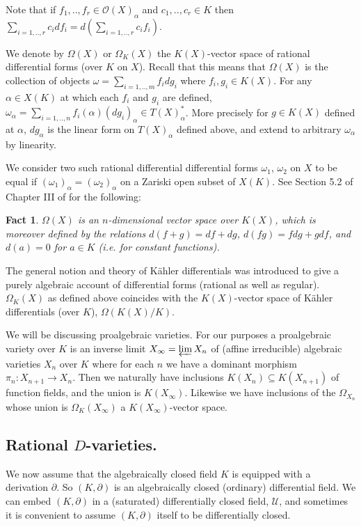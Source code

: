 \documentclass[12pt]{article}
\newtheorem{Fact}[Theorem]{Fact}
\begin{document}
Note that if $f_{1},..,f_{r}\in {\mathcal O}(X)_{\alpha}$ and $c_{1},..,c_{r}\in K$ then $\sum_{i=1,..,r}c_{i}df_{i} = d(\sum_{i=1,..,r}c_{i}f_{i})$. 

We denote by $\Omega(X)$ or $\Omega_{K}(X)$ the $K(X)$-vector space of rational differential forms (over $K$ on $X$).  Recall that this means that  ${\Omega}(X)$ is the collection of objects $\omega = \sum_{i=1,..,m}f_{i}dg_{i}$ where $f_{i}, g_{i}\in K(X)$. 
For any $\alpha\in X(K)$ at which each $f_{i}$ and $g_{i}$ are defined,  $\omega_{\alpha} = \sum_{i=1,..,n}  f_{i}(\alpha)(dg_{i})_{\alpha} \in T(X)_{\alpha}^{*}$.  More precisely for $g\in K(X)$ defined at $\alpha$, $dg_{\alpha}$ is the linear form 
on $T(X)_{\alpha}$ defined above, and extend to arbitrary $\omega_{\alpha}$ by linearity. 

We consider two such rational differential differential forms $\omega_{1}$, $\omega_{2}$ on $X$ to be equal if $(\omega_{1})_{\alpha}  =( \omega_{2})_{\alpha}$ on a Zariski open subset of $X(K)$. 
See Section 5.2 of  Chapter III of \cite{Shafarevich} for the following: 
\begin{Fact} $\Omega(X)$ is an $n$-dimensional vector space over $K(X)$, which is moreover defined by the relations $d(f+g) = df + dg$, $d(fg) = fdg + gdf$, and $d(a)= 0$ for $a\in K$ (i.e. for constant functions). 
\end{Fact}

The general notion and theory of K\"ahler differentials was introduced to give a purely algebraic account of differential forms (rational as well as regular). $\Omega_{K}(X)$ as defined above coincides with the $K(X)$-vector space of K\"ahler differentials (over $K$), $\Omega(K(X)/K)$.

We will be discussing proalgebraic varieties. For our purposes a proalgebraic variety over $K$ is an inverse limit  $X_{\infty} = \varprojlim X_{n}$ of (affine irreducible) algebraic varieties $X_{n}$ over $K$ where for each $n$ we have a dominant morphism $\pi_{n}:X_{n+1}\to X_{n}$.  Then we naturally have inclusions $K(X_{n}) \subseteq K(X_{n+1})$ of function fields, and the union is $K(X_{\infty})$. Likewise we have inclusions of the $\Omega_{X_{n}}$ whose union is $\Omega_{K}(X_{\infty})$ a $K(X_{\infty})$-vector space.

\subsection{Rational $D$-varieties.}  
We now assume that the algebraically closed field $K$ is equipped with a derivation $\partial$. So $(K,\partial)$ is an algebraically closed (ordinary) differential field.    We can embed $(K,\partial)$ in a (saturated) differentially closed field, ${\mathcal U}$, and sometimes it is convenient to assume $(K,\partial)$ itself to be differentially closed. 
\end{document}
